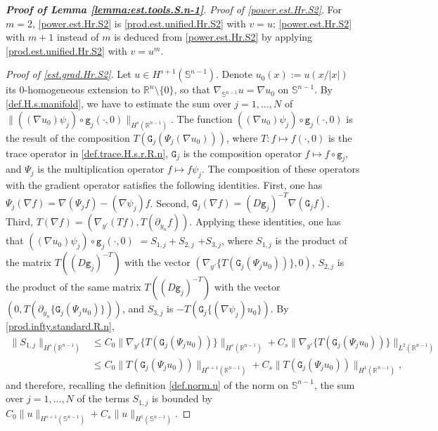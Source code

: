\documentclass[10pt,reqno,a4paper]{article}
\numberwithin{equation}{section}
\theoremstyle{plain}
\theoremstyle{definition}
\newcommand{\R}{{\mathbb R}}
\renewcommand{\S}{{\mathbb S}}
\newcommand{\pa}{\partial}
\newcommand{\grad}{\nabla}
\begin{document}
\begin{proof}[\textbf{Proof of Lemma \ref{lemma:est.tools.S.n-1}}]
\emph{Proof of \eqref{power.est.Hr.S2}}.
For $m=2$, \eqref{power.est.Hr.S2} is \eqref{prod.est.unified.Hr.S2} with $v = u$;
\eqref{power.est.Hr.S2} with $m+1$ instead of $m$ is deduced 
from \eqref{power.est.Hr.S2} by applying \eqref{prod.est.unified.Hr.S2} with $v = u^m$. 



\emph{Proof of \eqref{est.grad.Hr.S2}}. Let $u \in H^{s+1}(\S^{n-1})$. 
Denote $u_0(x) := u(x/|x|)$ its $0$-homogeneous extension to $\R^n \setminus \{ 0 \}$, 
so that $\grad_{\S^{n-1}} u = \grad u_0$ on $\S^{n-1}$. 
By \eqref{def.H.s.manifold}, we have to estimate the sum over $j=1, \ldots, N$ of 
$\| ((\grad u_0) \psi_j) \circ \mathtt g_j(\cdot, 0) \|_{H^s(\R^{n-1})}$. 
The function $((\grad u_0) \psi_j) \circ \mathtt g_j(\cdot, 0)$ 
is the result of the composition 
$T ( \mathtt G_j ( \Psi_j ( \grad u_0 )))$, where 
$T \colon f \mapsto f(\cdot , 0)$ is the trace operator in \eqref{def.trace.H.s.r.R.n},
$\mathtt G_j$ is the composition operator $f \mapsto f \circ \mathtt g_j$, 
and $\Psi_j$ is the multiplication operator $f \mapsto f \psi_j$. 
The composition of these operators with the gradient operator satisfies the following identities.
First, one has $\Psi_j (\grad f) = \grad (\Psi_j f) - (\grad \psi_j) f$. 
Second, $\mathtt G_j(\grad f) = (D \mathtt g_j)^{-T} \grad( \mathtt G_j f)$. 
Third, $T (\grad f) = (\grad_{y'} (T f) , T( \pa_{y_n} f ))$. 
Applying these identities, one has that $((\grad u_0) \psi_j) \circ \mathtt g_j(\cdot, 0)$ 
$= S_{1,j} + S_{2,j}$ $+ S_{3,j}$, where 
$S_{1,j}$ is the product of the matrix $T((D \mathtt g_j)^{-T})$ with the vector 
$( \grad_{y'} \{ T (\mathtt G_j (\Psi_j u_0)) \} , 0 )$, 
$S_{2,j}$ is the product of the same matrix $T( (D \mathtt g_j)^{-T})$ with the vector 
$( 0, T ( \pa_{y_n} \{ \mathtt G_j (\Psi_j u_0) \} ) )$, 
and $S_{3,j}$ is $- T( \mathtt G_j \{ (\grad \psi_j) u_0 \} )$. 
By \eqref{prod.infty.standard.R.n}, 
\begin{align*}
\| S_{1,j} \|_{H^s(\R^{n-1})} 
& \leq C_0 \| \grad_{y'} \{ T (\mathtt G_j (\Psi_j u_0)) \} \|_{H^s(\R^{n-1})} 
+ C_s \| \grad_{y'} \{ T (\mathtt G_j (\Psi_j u_0)) \} \|_{L^2(\R^{n-1})} 
\\
& \leq C_0 \| T (\mathtt G_j (\Psi_j u_0)) \|_{H^{s+1}(\R^{n-1})} 
+ C_s \| T (\mathtt G_j (\Psi_j u_0)) \|_{H^1(\R^{n-1})}, 
\end{align*}
and therefore, recalling the definition \eqref{def.norm.u} of the norm on $\S^{n-1}$, 
the sum over $j=1, \ldots, N$ of the terms $S_{1,j}$ is bounded by 
$C_0 \| u \|_{H^{s+1}(\S^{n-1})} + C_s \| u \|_{H^1(\S^{n-1})}$.  

\end{proof}
\end{document}
